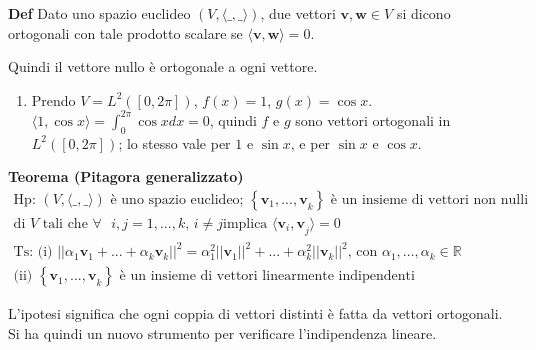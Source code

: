 \documentclass{article}
\begin{document}
\textbf{Def} Dato uno spazio euclideo $\left( V,\langle \_,\_\mathbf{\rangle 
}\right) $, due vettori $\mathbf{v,w}\in V$ si dicono ortogonali con tale
prodotto scalare se $\langle \mathbf{v,w\rangle }=0$.

Quindi il vettore nullo \`{e} ortogonale a ogni vettore.

\begin{enumerate}
\item Prendo $V=L^{2}\left( \left[ 0,2\pi \right] \right) $, $f\left(
x\right) =1$, $g\left( x\right) =\cos x$. $\langle 1,\cos x\mathbf{\rangle =}%
\int_{0}^{2\pi }\cos xdx=0$, quindi $f$ e $g$ sono vettori ortogonali in $%
L^{2}\left( \left[ 0,2\pi \right] \right) $; lo stesso vale per $1$ e $\sin
x $, e per $\sin x$ e $\cos x$.
\end{enumerate}

\textbf{Teorema (Pitagora generalizzato)}%
\begin{gather*}
\text{Hp}\text{: }\left( V,\langle \_,\_\mathbf{\rangle }\right) \text{ \`{e}
uno spazio euclideo; }\left\{ \mathbf{v}_{1}\mathbf{,...,v}_{k}\right\} 
\text{ \`{e} un insieme di vettori non nulli } \\
\text{di }V\text{ tali che }\forall \text{ }i,j=1,...,k\text{, }i\neq j\text{
implica }\langle \mathbf{v}_{i}\mathbf{,v}_{j}\mathbf{\rangle }=0 \\
\text{Ts}\text{: (i) }\left\vert \left\vert \alpha _{1}\mathbf{v}%
_{1}+...+\alpha _{k}\mathbf{v}_{k}\right\vert \right\vert ^{2}=\alpha
_{1}^{2}\left\vert \left\vert \mathbf{v}_{1}\right\vert \right\vert
^{2}+...+\alpha _{k}^{2}\left\vert \left\vert \mathbf{v}_{k}\right\vert
\right\vert ^{2}\text{, con }\alpha _{1},...,\alpha _{k}\in 
\mathbb{R}
\\
\text{(ii) }\left\{ \mathbf{v}_{1}\mathbf{,...,v}_{k}\right\} \text{ \`{e}
un insieme di vettori linearmente indipendenti}
\end{gather*}

L'ipotesi significa che ogni coppia di vettori distinti \`{e} fatta da
vettori ortogonali. Si ha quindi un nuovo strumento per verificare
l'indipendenza lineare.
\end{document}
